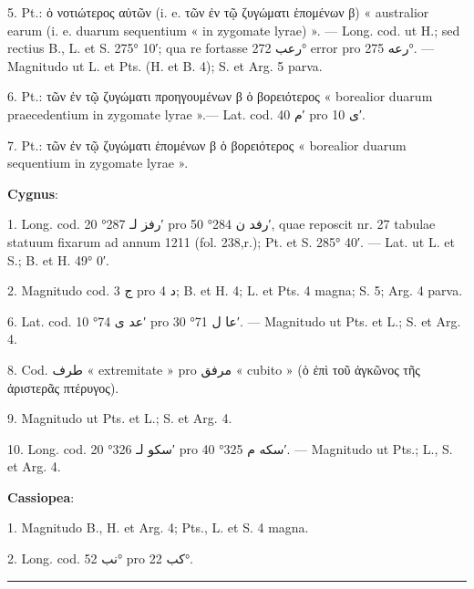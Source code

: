\documentclass[11pt]{article}
\begin{document}
{\small
\par\hangindent=12mm 5. Pt.: ὁ νοτιώτερος αὐτῶν (i. e. τῶν ἐν τῷ ζυγώματι ἑπομένων β) « australior earum (i. e. duarum sequentium « in zygomate lyrae) ». — Long. cod. ut H.; sed rectius B., L. et S. 275° 10′; qua re fortasse \textarabic{رعب} 272° error pro \textarabic{رعه} 275°. — Magnitudo ut L. et Pts. (H. et B. 4); S. et Arg. 5 parva.
\par\hangindent=12mm 6. Pt.: τῶν ἐν τῷ ζυγώματι προηγουμένων β ὁ βορειότερος « borealior duarum praecedentium in zygomate lyrae ».— Lat. cod. \textarabic{م} 40′ pro \textarabic{ى} 10′.
\par\hangindent=12mm 7. Pt.: τῶν ἐν τῷ ζυγώματι ἑπομένων β ὁ βορειότερος « borealior duarum sequentium in zygomate lyrae ».
\par\hspace*{8mm}\textbf{Cygnus}:
\par\hangindent=12mm 1. Long. cod. \textarabic{رفز لـ} 287° 20′ pro \textarabic{رفد ن} 284° 50′, quae reposcit nr. 27 tabulae statuum fixarum ad annum 1211 (fol. 238,r.); Pt. et S. 285° 40′. — Lat. ut L. et S.; B. et H. 49° 0′.
\par\hangindent=12mm 2. Magnitudo cod. \textarabic{ج} 3 pro \textarabic{د} 4; B. et H. 4; L. et Pts. 4 magna; S. 5; Arg. 4 parva.
\par\hangindent=12mm 6. Lat. cod. \textarabic{عد ى} 74° 10′ pro \textarabic{عا ل} 71° 30′. — Magnitudo ut Pts. et L.; S. et Arg. 4.
\par\hangindent=12mm 8. Cod. \textarabic{طرف} « extremitate » pro \textarabic{مرفق} « cubito » (ὁ ἐπὶ τοῦ ἀγκῶνος τῆς ἀριστερᾶς πτέρυγος).
\par\hangindent=12mm 9. Magnitudo ut Pts. et L.; S. et Arg. 4.
\par\hangindent=12mm 10. Long. cod. \textarabic{سكو لـ} 326° 20′ pro \textarabic{سكه م} 325° 40′. — Magnitudo ut Pts.; L., S. et Arg. 4.
\par\hspace*{8mm}\textbf{Cassiopea}:
\par\hangindent=12mm 1. Magnitudo B., H. et Arg. 4; Pts., L. et S. 4 magna.
\par\hangindent=12mm 2. Long. cod. \textarabic{نب} 52° pro \textarabic{كب} 22°.
\par}
\clearpage
\noindent{}\par\vspace{-1mm}\noindent\rule{\textwidth}{.4pt}\par\vspace{2mm}
\end{document}
